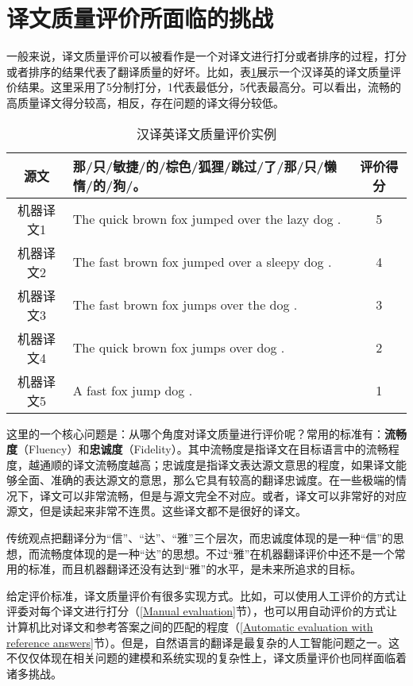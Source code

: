 \section{译文质量评价所面临的挑战}

\parinterval 一般来说，译文质量评价可以被看作是一个对译文进行打分或者排序的过程，打分或者排序的结果代表了翻译质量的好坏。比如，表\ref{tab:4-1}展示一个汉译英的译文质量评价结果。这里采用了5分制打分，1代表最低分，5代表最高分。可以看出，流畅的高质量译文得分较高，相反，存在问题的译文得分较低。

\begin{table}[htp]{
\begin{center}
\caption{汉译英译文质量评价实例}
{
\begin{tabular}{c|l|c}
源文 & 那/只/敏捷/的/棕色/狐狸/跳过/了/那/只/懒惰/的/狗/。 & 评价得分 \\
\hline
\rule{0pt}{10pt} 机器译文1 & The quick brown fox jumped over the lazy dog . & 5 \\
\rule{0pt}{10pt} 机器译文2 & The fast brown fox jumped over a sleepy dog . & 4 \\
\rule{0pt}{10pt} 机器译文3 & The fast brown fox jumps over the dog . & 3 \\
\rule{0pt}{10pt} 机器译文4 & The quick brown fox jumps over dog . & 2 \\
\rule{0pt}{10pt} 机器译文5 & A fast fox jump dog . & 1 \\
\end{tabular}
\label{tab:4-1}
}
\end{center}
}\end{table}

\parinterval 这里的一个核心问题是：从哪个角度对译文质量进行评价呢？常用的标准有：{\small\sffamily\bfseries{流畅度}}（Fluency）和{\small\sffamily\bfseries{忠诚度}}（Fidelity）。其中流畅度是指译文在目标语言中的流畅程度，越通顺的译文流畅度越高；忠诚度是指译文表达源文意思的程度，如果译文能够全面、准确的表达源文的意思，那么它具有较高的翻译忠诚度。在一些极端的情况下，译文可以非常流畅，但是与源文完全不对应。或者，译文可以非常好的对应源文，但是读起来非常不连贯。这些译文都不是很好的译文。

\parinterval 传统观点把翻译分为“信”、“达”、“雅”三个层次，而忠诚度体现的是一种“信”的思想，而流畅度体现的是一种“达”的思想。不过“雅”在机器翻译评价中还不是一个常用的标准，而且机器翻译还没有达到“雅”的水平，是未来所追求的目标。

\parinterval 给定评价标准，译文质量评价有很多实现方式。比如，可以使用人工评价的方式让评委对每个译文进行打分（\ref{Manual evaluation}节），也可以用自动评价的方式让计算机比对译文和参考答案之间的匹配的程度（\ref{Automatic evaluation with reference answers}节）。但是，自然语言的翻译是最复杂的人工智能问题之一。这不仅仅体现在相关问题的建模和系统实现的复杂性上，译文质量评价也同样面临着诸多挑战。

